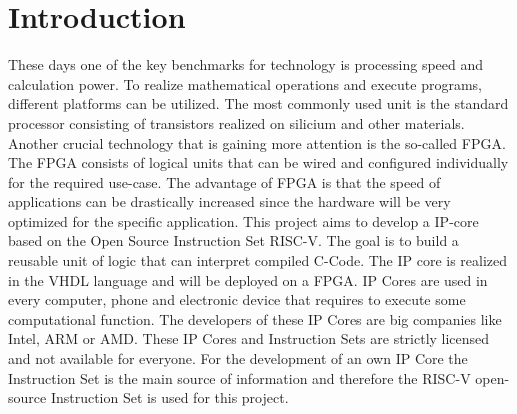 
\chapter{Introduction}
These days one of the key benchmarks for technology is processing speed and
calculation power. To realize mathematical operations and execute programs,
different platforms can be utilized. The most commonly used unit is the standard
processor consisting of transistors realized on silicium and other materials.
Another crucial technology that is gaining more attention is the so-called
\acf{FPGA}. The FPGA consists of logical units that can
be wired and configured individually for the required use-case. The advantage of
FPGA is that the speed of applications can be drastically increased since the
hardware will be very optimized for the specific application.
This project aims to develop a \acf{IP}-core based on the Open
Source Instruction Set \acs{RISC}-V. The goal is to build a reusable unit of logic that can
interpret compiled C-Code. The IP core is realized in the \ac{VHDL} language and will be deployed on a FPGA. IP Cores are used in every computer, phone and electronic device that requires to execute some computational function. The developers of these IP Cores are big
companies like Intel, ARM or AMD. These IP Cores and Instruction Sets are strictly
licensed and not available for everyone. For the development of an own IP Core the
Instruction Set is the main source of information and therefore the RISC-V
open-source Instruction Set is used for this project.
